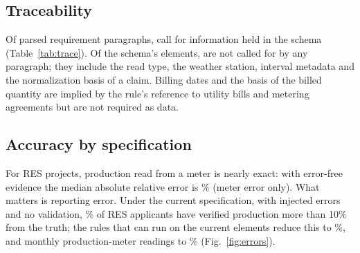\documentclass[preprint,12pt]{elsarticle}
\begin{document}
\subsection{Traceability}

Of \TraceTotal{} parsed requirement paragraphs, \TraceEvidence{} call for information held
in the schema (Table~\ref{tab:trace}). Of the schema's \SchemaSlots{} elements,
\SchemaSlotsBeyondRule{} are not called for by any paragraph; they include the read type,
the weather station, interval metadata and the normalization basis of a claim. Billing
dates and the basis of the billed quantity are implied by the rule's reference to
utility bills and metering agreements but are not required as data.

\begin{table}[t]
\caption{Requirement-to-schema traceability by section of 7 CFR part 4280 subpart B
(summary; full table in the SI).}\label{tab:trace}
\centering\footnotesize

\end{table}

\subsection{Accuracy by specification}

For RES projects, production read from a meter is nearly exact: with error-free evidence
the median absolute relative error is \AccCurrentCleanResMedian\% (meter error only).
What matters is reporting error. Under the current specification, with injected errors
and no validation, \AccCurrentUnvalidatedResShareTen\% of RES applicants have verified
production more than 10\% from the truth; the rules that can run on the current elements
reduce this to \AccCurrentValidatedResShareTen\%, and monthly production-meter readings
to \AccProductionMeterValidatedResShareTen\% (Fig.~\ref{fig:errors}).
\end{document}
